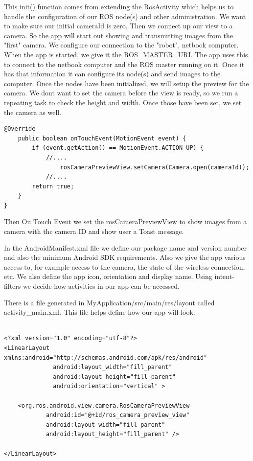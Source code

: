 \documentclass[10pt,a4paper]{article}
\begin{document}
This init() function comes from extending the RosActivity which helps us to handle the configuration of our ROS node(s) and other administration. We want to make sure our initial cameraId is zero. Then we connect up our view to a camera. So the app will start out showing and transmitting images from the "first" camera. We configure our connection to the "robot", netbook computer. When the app is started, we give it the ROS\_MASTER\_URI. The app uses this to connect to the netbook computer and the ROS master running on it. Once it has that information it can configure its node(s) and send images to the computer. Once the nodes have been initialized, we will setup the preview for the camera. We dont want to set the camera before the view is ready, so we run a repeating task to check the height and width. Once those have been set, we set the camera as well.

\begin{lstlisting}[frame=single] 
 @Override
    public boolean onTouchEvent(MotionEvent event) {
        if (event.getAction() == MotionEvent.ACTION_UP) {
            //....
                rosCameraPreviewView.setCamera(Camera.open(cameraId));
            //....    
        return true;
    }
}
\end{lstlisting}

Then On Touch Event we set the rosCameraPreviewView to show images from a camera with the camera ID and show user a Toast message.

In the AndroidManifest.xml file we define our package name and version number and also the minimum Android SDK requirements. Also we give the app various access to, for example access to the camera, the state of the wireless connection, etc. We also define the app icon, orientation and display name. Using intent-filters we decide how activities in our app can be accessed.

There is a file generated in MyApplication/src/main/res/layout called activity\_main.xml. This file helps define how our app will look.\\\\

\begin{lstlisting}[frame=single]
<?xml version="1.0" encoding="utf-8"?>
<LinearLayout xmlns:android="http://schemas.android.com/apk/res/android"
              android:layout_width="fill_parent"
              android:layout_height="fill_parent"
              android:orientation="vertical" >

    <org.ros.android.view.camera.RosCameraPreviewView
            android:id="@+id/ros_camera_preview_view"
            android:layout_width="fill_parent"
            android:layout_height="fill_parent" />

</LinearLayout>
\end{lstlisting}
\end{document}
